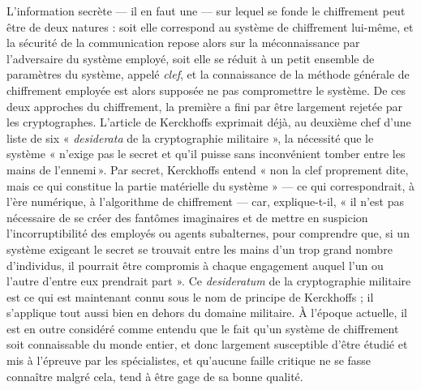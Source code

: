



L’information secrète --- il en faut une --- sur lequel se fonde le chiffrement peut être de deux natures : soit elle
correspond au système de chiffrement lui-même, et la sécurité de la communication repose alors
sur la méconnaissance par l’adversaire du système employé, soit elle se réduit à un petit ensemble de
paramètres du système, appelé {\it clef}, et la connaissance de la méthode générale de chiffrement
employée est alors supposée ne pas compromettre le système.
De ces deux approches du chiffrement, la première a fini par être largement rejetée par les
cryptographes.
L’article de Kerckhoffs exprimait déjà, au deuxième chef d’une liste de six « {\it desiderata\/} de
la cryptographie militaire », la nécessité que le système « n’exige pas le secret et qu’il puisse
sans inconvénient tomber entre les mains de l’ennemi ».
Par secret, Kerckhoffs entend « non la clef proprement dite, mais ce qui constitue la partie
matérielle du système » --- ce qui correspondrait, à l’ère numérique, à l'algorithme de chiffrement
--- car, explique-t-il, « il n’est pas nécessaire de se créer des fantômes imaginaires et de mettre
en suspicion l’incorruptibilité des employés ou agents subalternes, pour comprendre que, si un
système exigeant le secret se trouvait entre les mains d’un trop grand nombre d’individus, il
pourrait être compromis à chaque engagement auquel l’un ou l’autre d’entre eux prendrait part ».
Ce {\it desideratum} de la cryptographie militaire est ce qui est maintenant connu sous le nom de
principe de Kerckhoffs ; il s’applique tout aussi bien en dehors du domaine militaire.
À l’époque actuelle, il est en outre considéré comme entendu que le fait qu’un système de
chiffrement soit connaissable du monde entier, et donc largement susceptible d’être étudié et mis à
l’épreuve par les spécialistes, et qu’aucune faille critique ne se fasse connaître malgré cela, tend
à être gage de sa bonne qualité.

